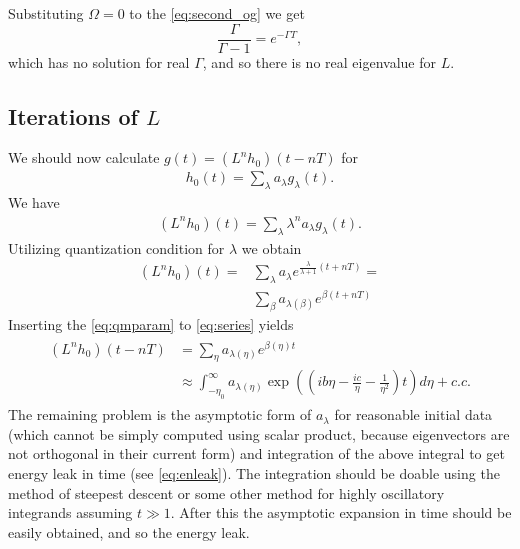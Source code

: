 \documentclass[
a4paper,%
10pt,%
titlepage,%
twoside%
]{article}
\begin{document}
Substituting $\Omega=0$ to the \eqref{eq:second_og} we get
\begin{equation}
  \label{eq:omega0}
  \frac{\Gamma}{\Gamma-1}=e^{-\Gamma T},
\end{equation}
which has no solution for real $\Gamma$, and so there is no real
eigenvalue for $L$.


\subsection{Iterations of $L$}

We should now calculate $g(t)=(L^n h_0)(t-nT)$ for
\begin{gather}
  h_0(t)=\sum_\lambda a_\lambda g_\lambda(t).
\end{gather}
We have
\begin{gather}
  (L^n h_0)(t)=\sum_\lambda \lambda^n a_\lambda g_\lambda(t).
\end{gather}
Utilizing quantization condition for $\lambda$ we obtain
\begin{align}\label{eq:series}
  (L^n h_0)(t) =&\sum_\lambda a_\lambda e^{\frac{\lambda}{\lambda+1}(t+nT)}=\\
  &\sum_\beta a_{\lambda(\beta)}e^{\beta(t+nT)}
  \end{align}
Inserting the \eqref{eq:qmparam} to \eqref{eq:series} yields
\begin{gather}
  \begin{split}
    (L^n h_0)(t-nT) &=\sum_\eta a_{\lambda(\eta)} e^{\beta(\eta)t}\\
    &\approx \int_{-\eta_0}^\infty a_{\lambda(\eta)}\exp((ib\eta-\frac{ic}{\eta}-\frac{1}{\eta^2})t)d\eta+c.c.
  \end{split}
\end{gather}
The remaining problem is the asymptotic form of $a_{\lambda}$ for
reasonable initial data (which cannot be simply computed using scalar
product, because eigenvectors are not orthogonal in their current
form) and integration of the above integral to get energy leak in time
(see \eqref{eq:enleak}). The integration should be doable using the
method of steepest descent or some other method for highly oscillatory
integrands assuming $t\gg 1$. After this the asymptotic expansion in
time should be easily obtained, and so the energy leak.


\end{document}
